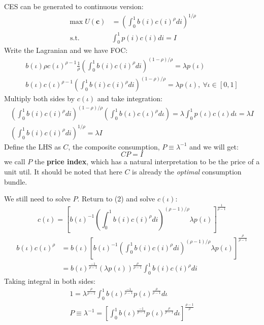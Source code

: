 \documentclass{book}
\theoremstyle{plain}
\theoremstyle{definition}
\begin{document}
CES can be generated to continuous version:
\[\begin{aligned} \max U ( \mathbf { c } ) & = \left( \int _ { 0 } ^ { 1 } b ( i ) c ( i ) ^ { \rho } d i \right) ^ { 1 / \rho } \\ \text { s.t. } & \int _ { 0 } ^ { 1 } p ( i ) c ( i ) d i = I \end{aligned}\]
Write the Lagranian and we have FOC:
\begin{align*}
	b(\iota)\rho c(\iota)^{\rho-1} \frac{1}{\rho} \left( \int _ { 0 } ^ { 1 } b ( i ) c ( i ) ^ { \rho } d i \right) ^ { (1-\rho) / \rho }
	= \lambda p(\iota) \\
	b(\iota)c(\iota)^{\rho-1} \left( \int _ { 0 } ^ { 1 } b ( i ) c ( i ) ^ { \rho } d i \right) ^ { (1 - \rho )/ \rho } 
	= \lambda p(\iota),\ \forall \iota \in [0,1] \tag{2}
\end{align*}
Multiply both sides by $c(\iota)$ and take integration:
\begin{align*}
	\left( \int _ { 0 } ^ { 1 } b ( i ) c ( i ) ^ { \rho } d i \right) ^ { ( 1 - \rho ) / \rho }
	\left( \int _ { 0 } ^ { 1 } b ( \iota ) c ( \iota ) ^ { \rho } d \iota \right) 
	= \lambda \int _ { 0 } ^ { 1 } p ( \iota ) c ( \iota ) d \iota = \lambda I\\
	\left( \int _ { 0 } ^ { 1 } b ( i ) c ( i ) ^ { \rho } d i \right) ^ { 1 / \rho } = \lambda I
\end{align*}
Define the LHS as $C$, the composite consumption, $P\equiv\lambda^{-1}$ and we will get:
\[CP = I\]
we call $P$ the \textbf{price index}, which has a natural interpretation to be the price of a unit util. 
It should be noted that here $C$ is already the \textit{optimal} consumption bundle. 

We still need to solve $P$. Return to (2) and solve $c(\iota)$:
\[
c(\iota) = 
\left[b(\iota)^{-1} \left( \int _ { 0 } ^ { 1 } b ( i ) c ( i ) ^ { \rho } d i \right) ^ { ( \rho -1) / \rho } \lambda p(\iota)
\right]^{\frac{1}{\rho-1}}
\]
\begin{align*}
	b(\iota)c(\iota)^{\rho} &= 
b(\iota)\left[b(\iota)^{-1} \left( \int _ { 0 } ^ { 1 } b ( i ) c ( i ) ^ { \rho } d i \right) ^ { ( \rho -1) / \rho } \lambda p(\iota)
\right]^{\frac{\rho}{\rho-1}}\\
&= b(\iota)^{\frac{-1}{\rho-1}}\left(\lambda p(\iota)\right)^{\frac{\rho}{\rho-1}} \int _ { 0 } ^ { 1 } b ( i ) c ( i ) ^ { \rho } d i
\end{align*}
Taking integral in both sides:
\begin{align*}
	1 = 
	\lambda^{\frac{\rho}{\rho-1}}
	\int_0^1 b(\iota)^{\frac{-1}{\rho-1}} p(\iota)^{\frac{\rho}{\rho-1}} d \iota\\
	P \equiv \lambda^{-1} = \left[\int_0^1 b(\iota)^{\frac{-1}{\rho-1}} p(\iota)^{\frac{\rho}{\rho-1}} d \iota\right]^{\frac{\rho-1}{\rho}}
\end{align*}
\end{document}
